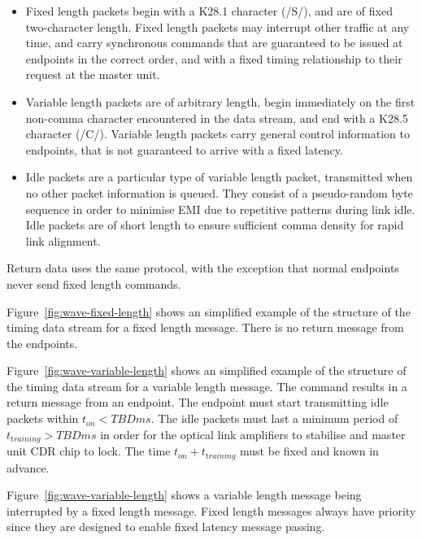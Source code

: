 \documentclass[a4paper,11pt]{article}
\begin{document}
\begin{itemize}
	\item Fixed length packets begin with a K28.1 character (/S/), and are of fixed two-character length. Fixed length packets may interrupt other traffic at any time, and carry synchronous commands that are guaranteed to be issued at endpoints in the correct order, and with a fixed timing relationship to their request at the master unit.
	\item Variable length packets are of arbitrary length, begin immediately on the first non-comma character encountered in the data stream, and end with a K28.5 character (/C/). Variable length packets carry general control information to endpoints, that is not guaranteed to arrive with a fixed latency.
	\item Idle packets are a particular type of variable length packet, transmitted when no other packet information is queued. They consist of a pseudo-random byte sequence in order to minimise EMI due to repetitive patterns during link idle. Idle packets are of short length to ensure sufficient comma density for rapid link alignment.
\end{itemize}

Return data uses the same protocol, with the exception that normal endpoints never send fixed length commands. 

Figure~\ref{fig:wave-fixed-length} shows an simplified example of the structure of the timing data stream for a fixed length message. There is no return message from the endpoints. 

Figure~\ref{fig:wave-variable-length} shows an simplified example of the structure of the timing data stream for a variable length message. The command results in a return message from an endpoint. The endpoint must start transmitting idle packets within $t_{\mathrm on} < TBD ms$. The idle packets must last a minimum period of $t_{\mathrm training} > TBD ms$ in order for the optical link amplifiers to stabilise and master unit CDR chip to lock. The time $t_{\mathrm on}  + t_{\mathrm training}$ must be fixed and known in advance.

Figure~\ref{fig:wave-variable-length} shows a variable length message being interrupted by a fixed length message. Fixed length messages always have priority since they are designed to enable fixed latency message passing.
\end{document}
